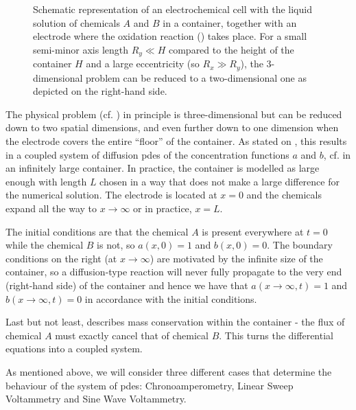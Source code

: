 \documentclass{prettytex/ox/mmsc-special-topic}
\begin{document}
  \begin{figure}[H]
    \centering
    \caption{Schematic representation of an electrochemical cell with the liquid solution of chemicals $A$ and $B$ in a container, together with an electrode where the oxidation reaction () takes place. For a small semi-minor axis length $R_y \ll H$ compared to the height of the container $H$ and a large eccentricity (so $R_x \gg R_y$), the 3-dimensional problem can be reduced to a two-dimensional one as depicted on the right-hand side.}
    \label{fig:battery-schema}
  \end{figure}

  The physical problem (cf. ) in principle is three-dimensional but can be reduced down to two spatial dimensions, and even further down to one dimension when the electrode covers the entire ``floor'' of the container.
  As stated on , this results in a coupled system of diffusion \gls{pde}s of the concentration functions $a$ and $b$, cf.  in an infinitely large container.
  In practice, the container is modelled as large enough with length $L$ chosen in a way that does not make a large difference for the numerical solution.
  The electrode is located at $x = 0$ and the chemicals expand all the way to $x \rightarrow \infty$ or in practice, $x = L$.

  The initial conditions are that the chemical $A$ is present everywhere at $t=0$ while the chemical $B$ is not, so $a(x, 0) = 1$ and $b(x, 0) = 0$.
  The boundary conditions on the right (at $x \rightarrow \infty$) are motivated by the infinite size of the container, so a diffusion-type reaction will never fully propagate to the very end (right-hand side) of the container and hence we have that $a(x\rightarrow\infty, t) = 1$ and $b(x\rightarrow\infty, t) = 0$ in accordance with the initial conditions.

  Last but not least,  describes mass conservation within the container - the flux of chemical $A$ must exactly cancel that of chemical $B$. This turns the differential equations into a coupled system.

  As mentioned above, we will consider three different cases that determine the behaviour of the system of \gls{pde}s: Chronoamperometry, Linear Sweep Voltammetry and Sine Wave Voltammetry.
\end{document}
